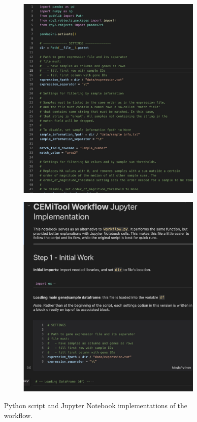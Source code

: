 \begin{figure}[!htb]

  \begin{subfigure}{0.5\textwidth}
    \includegraphics[width=0.95\linewidth]{images/script} 
  \end{subfigure}
  \begin{subfigure}{0.5\textwidth}
    \includegraphics[width=0.95\linewidth]{images/jupyter}
  \end{subfigure}

\caption{Python script and Jupyter Notebook implementations of the workflow.}
\label{fig:workflow}
\end{figure}

